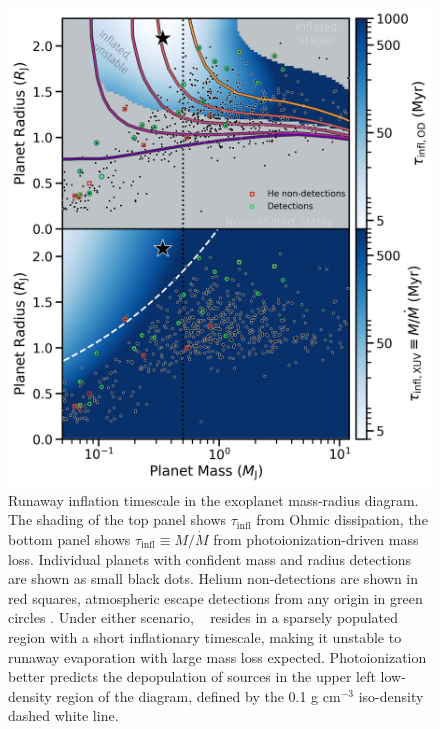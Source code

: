 \documentclass[twocolumn]{aastex631}
\newcommand{\hatpb}{\object{HAT-P-67 b}}
\begin{document}
\begin{figure}[t]
    \includegraphics[width=\linewidth]{figures/thorn2023_theory.png}
    \caption{Runaway inflation timescale in the exoplanet mass-radius diagram.  The shading of the top panel shows $\tau_\mathrm{infl}$ from Ohmic dissipation, the bottom panel shows $\tau_\mathrm{infl}\equiv M/\dot{M}$ from photoionization-driven mass loss.  Individual planets with confident mass and radius detections are shown as small black dots. Helium non-detections are shown in red squares, atmospheric escape detections from any origin in green circles \citep{2022arXiv221116243D}.  Under either scenario, \hatpb~ resides in a sparsely populated region with a short inflationary timescale, making it unstable to runaway evaporation with large mass loss expected.  Photoionization better predicts the depopulation of sources in the upper left low-density region of the diagram, defined by the 0.1 g cm$^{-3}$ iso-density dashed white line.}
    \label{fig:tf2018_theory}
\end{figure}
\end{document}
